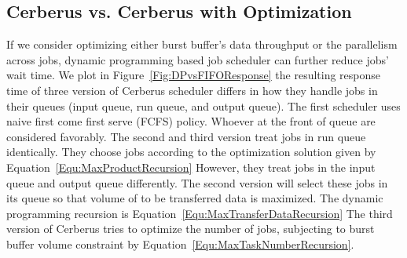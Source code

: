 \subsection{Cerberus vs. Cerberus with Optimization}
If we consider optimizing either burst buffer's data throughput or the parallelism across jobs,
dynamic programming based job scheduler can further reduce jobs' wait time.
We plot in Figure~\ref{Fig:DPvsFIFOResponse} the resulting response time of
three version of Cerberus scheduler differs in
how they handle jobs in their queues (input queue, run queue, and output queue).
The first scheduler uses naive first come first serve (FCFS) policy.
Whoever at the front of queue are considered favorably.
The second and third version treat jobs in run queue identically.
They choose jobs according to the optimization solution
given by Equation~\ref{Equ:MaxProductRecursion}
However, they treat jobs in the input queue and output queue differently.
The second version will select these jobs in its queue so that
volume of to be transferred data is maximized.
The dynamic programming recursion is Equation~\ref{Equ:MaxTransferDataRecursion}
The third version of Cerberus tries to optimize the number of jobs,
subjecting to burst buffer volume constraint by Equation~\ref{Equ:MaxTaskNumberRecursion}.

